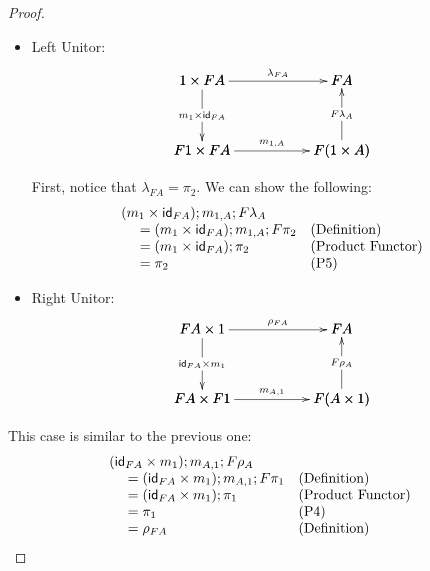 \begin{proof}
\begin{itemize}
  \item[] Left Unitor:\\
    \[
    \bfig
    \square|amma|/->`->`<-`->/<1000,500>[
      1 \times FA`
      FA`
      F1 \times FA`
      F(1 \times A);
      {\lambda}_{FA}`
      m_{1} \times \id_{FA}`
      F{\lambda}_{A}`
      m_{1,A}]
    \efig
    \]
  
  First, notice that $\lambda_{FA} = \pi_2$. We can show the following:
  \[
  \begin{array}{lll}
    (m_1 \times \mathsf{id}_{FA});m_{1,A};F\lambda_A\\
    \,\,\,\,\,\,\,\,= (m_1 \times \mathsf{id}_{FA});m_{1,A};F\pi_2 & \text{(Definition)}\\
    \,\,\,\,\,\,\,\,= (m_1 \times \mathsf{id}_{FA});\pi_2 & \text{(Product Functor)}\\
    \,\,\,\,\,\,\,\,= \pi_2 & \text{(P5)}\\
  \end{array}
  \]

\item[] Right Unitor:\\
  \[
  \bfig
  \square|amma|/->`->`<-`->/<1000,500>[
    FA \times 1`
    FA`
    FA \times F1`
    F(A \times 1);
    {\rho}_{FA}`
    \id_{FA} \times m_{1}`
    F{\rho}_{A}`
    m_{A,1}]
  \efig
  \]
  \end{itemize}
  This case is similar to the previous one:
  \[
  \begin{array}{lll}
    (\mathsf{id}_{FA} \times m_1);m_{A,1};F\rho_A\\
    \,\,\,\,\,\,\,\,=  (\mathsf{id}_{FA} \times m_1);m_{A,1};F\pi_1 & \text{(Definition)}\\
    \,\,\,\,\,\,\,\,=  (\mathsf{id}_{FA} \times m_1);\pi_1 & \text{(Product Functor)}\\
    \,\,\,\,\,\,\,\,=  \pi_1 & \text{(P4)}\\
    \,\,\,\,\,\,\,\,=  \rho_{FA} & \text{(Definition)}\\
  \end{array}
  \]


\end{proof}
